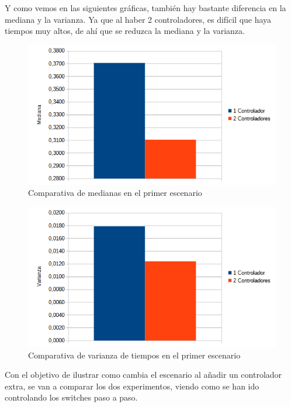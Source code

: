 \documentclass[a4paper, 12pt]{book}
\begin{document}
 	
 	Y como vemos en las siguientes gráficas, también hay bastante diferencia en la mediana y la varianza. Ya que al haber 2 controladores, es difícil que haya tiempos muy altos, de ahí que se reduzca la mediana y la varianza.
 	
 	\begin{figure}[H]
 		\centering
 		\includegraphics[width=12cm, keepaspectratio]{img/comparativamedianabucle}
 		\caption{Comparativa de medianas en el primer escenario}
 		\label{figura:medianabucle4}
 	\end{figure}
 	
 	\begin{figure}[H]
 		\centering
 		\includegraphics[width=12cm, keepaspectratio]{img/comparativavarianzabucle}
 		\caption{Comparativa de varianza de tiempos en el primer escenario}
 		\label{figura:varianzabucle4}
 	\end{figure}
 	
 	Con el objetivo de ilustrar como cambia el escenario al añadir un controlador extra, se van a comparar los dos experimentos, viendo como se han ido controlando los switches paso a paso.
 	
\end{document}
